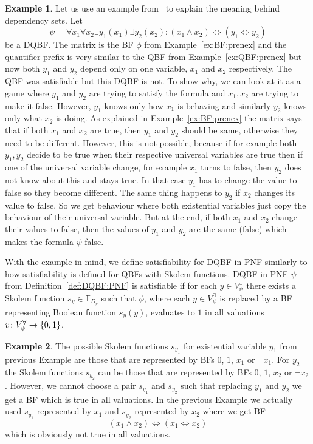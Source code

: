 \documentclass[
  digital, %
  twoside, %
  table,   %
  nolof,     %
  nolot,     %
]{fithesis3}
\let\setbuilder\set
\newcommand{\simpleset}[1]{\{{#1}\}}
\renewcommand{\set}[1]{\normalexpandarg\IfSubStr{#1}{|}{\setbuilder{#1}}{\simpleset{#1}}}
\theoremstyle{definition}
\newtheorem{example}{Example}
\theoremstyle{remark}
\newcommand{\BFuncs}[1]{\mathbb{F}_{#1}}
\newcommand{\evars}[1]{V_{#1}^{\exists}}
\newcommand{\uvars}[1]{V_{#1}^{\forall}}
\newcommand{\lequal}{\Leftrightarrow}
\begin{document}
\begin{example}
Let us use an example from~\cite{DQBFProofSystem} to explain the meaning behind dependency sets. Let 
\[\psi = \forall x_1 \forall x_2 \exists y_1 (x_1) \exists y_2 (x_2) : (x_1 \land x_2) \lequal (y_1 \lequal y_2)\]
be a DQBF. The matrix is the BF $\phi$ from Example~\ref{ex:BF:prenex} and the quantifier prefix is very similar to the QBF from Example~\ref{ex:QBF:prenex} but now both $y_1$ and $y_2$ depend only on one variable, $x_1$ and $x_2$ respectively. The QBF was satisfiable but this DQBF is not. To show why, we can look at it as a game where $y_1$  and $y_2$ are trying to satisfy the formula and $x_1,x_2$ are trying to make it false. However, $y_1$ knows only how $x_1$ is behaving and similarly $y_2$ knows only what $x_2$ is doing. As explained in Example~\ref{ex:BF:prenex} the matrix says that if both $x_1$ and $x_2$ are true, then $y_1$ and $y_2$ should be same, otherwise they need to be different. However, this is not possible, because if for example both $y_1,y_2$ decide to be true when their respective universal variables are true then if one of the universal variable change, for example $x_1$ turns to false, then $y_2$ does not know about this and stays true. In that case $y_1$ has to change the value to false so they become different. The same thing happens to $y_2$ if $x_2$ changes its value to false. So we get behaviour where both existential variables just copy the behaviour of their universal variable. But at the end, if both $x_1$ and $x_2$ change their values to false, then the values of $y_1$ and $y_2$ are the same (false) which makes the formula $\psi$ false.
\end{example}

With the example in mind, we define satisfiability for DQBF in PNF similarly to how satisfiability is defined for QBFs with Skolem functions. DQBF in PNF $\psi$ from Definition~\ref{def:DQBF:PNF} is satisfiable if for each $y \in \evars{\psi}$ there exists a Skolem function $s_y \in \BFuncs{D_y}$ such that $\phi$, where each $y \in \evars{\psi}$ is replaced by a BF representing Boolean function $s_y(y)$, evaluates to $1$ in all valuations $v\colon \uvars{\psi} \to \set{0,1}$.

\begin{example}
The possible Skolem functions $s_{y_1}$ for existential variable $y_1$ from previous Example are those that are represented by BFs $0$, $1$, $x_1$ or $\neg x_1$. For $y_2$ the Skolem functions $s_{y_2}$ can be those that are represented by BFs $0$, $1$, $x_2$ or $\neg x_2$. However, we cannot choose a pair $s_{y_1}$ and $s_{y_2}$ such that replacing $y_1$ and $y_2$ we get a BF which is true in all valuations. In the previous Example we actually used $s_{y_1}$ represented by $x_1$ and $s_{y_2}$ represented by $x_2$ where we get BF
\[(x_1 \land x_2) \lequal (x_1 \lequal x_2)\]
which is obviously not true in all valuations.
\end{example}
\end{document}

